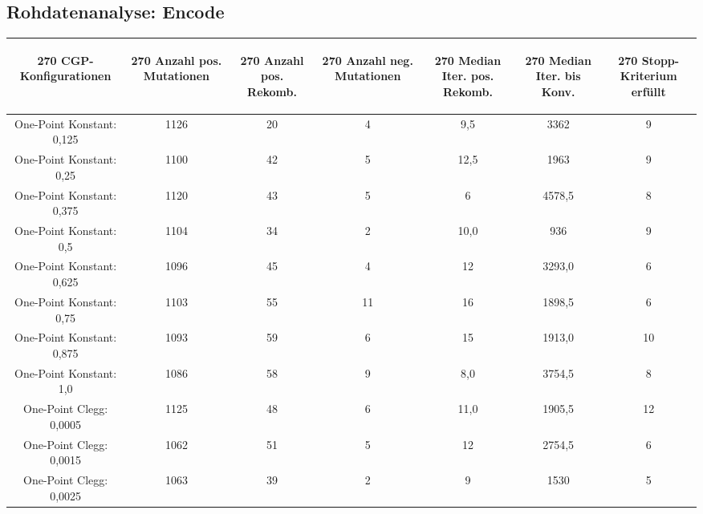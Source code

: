\subsection{Rohdatenanalyse: Encode}
\label{subsec:rohdatenEncode}

\begin{table}[H]
	\centering
	\begin{tabular}{c | c | c | c | c | c | c}
		\begin{turn}{270} \textbf{CGP-Konfigurationen} \end{turn} & \begin{turn}{270} \textbf{Anzahl pos. Mutationen} \end{turn} & \begin{turn}{270} \textbf{Anzahl pos. Rekomb.} \end{turn} & \begin{turn}{270} \textbf{Anzahl neg. Mutationen} \end{turn} & \begin{turn}{270} \textbf{Median Iter. pos. Rekomb.} \end{turn} & \begin{turn}{270} \textbf{Median Iter. bis Konv.} \end{turn} & \begin{turn}{270} \textbf{Stopp-Kriterium erfüllt} \end{turn}\\
		\hline
		One-Point Konstant: 0,125 & 1126 & 20 & 4 & 9,5 & 3362 & 9\\
		\hline
		One-Point Konstant: 0,25 & 1100 & 42 & 5 & 12,5 & 1963 & 9\\
		\hline
		One-Point Konstant: 0,375 & 1120 & 43 & 5 & 6 & 4578,5 & 8\\
		\hline
		One-Point Konstant: 0,5 & 1104 & 34 & 2 & 10,0 & 936 & 9\\
		\hline
		One-Point Konstant: 0,625 & 1096 & 45 & 4 & 12 & 3293,0 & 6\\
		\hline
		One-Point Konstant: 0,75 & 1103 & 55 & 11 & 16 & 1898,5 & 6\\
		\hline
		One-Point Konstant: 0,875 & 1093 & 59 & 6 & 15 & 1913,0 & 10\\
		\hline
		One-Point Konstant: 1,0 & 1086 & 58 & 9 & 8,0 & 3754,5 & 8\\
		\hline
		One-Point Clegg: 0,0005 & 1125 & 48 & 6 & 11,0 & 1905,5 & 12\\
		\hline
		One-Point Clegg: 0,0015 & 1062 & 51 & 5 & 12 & 2754,5 & 6\\
		\hline
		One-Point Clegg: 0,0025 & 1063 & 39 & 2 & 9 & 1530 & 5\\

\end{tabular}
\end{table}

